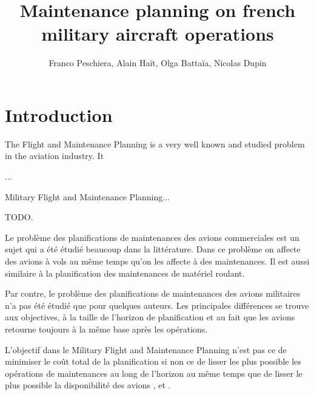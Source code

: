 \documentclass{roadef}
\begin{document}
\title{Maintenance planning on french military aircraft operations}

\def\shorttitle{Titre court}

\author{Franco Peschiera, Alain Haït, Olga Battaïa, Nicolas Dupin}


{}


\maketitle
\thispagestyle{empty}



\section{Introduction}

    The Flight and Maintenance Planning is a very well known and studied problem in the aviation industry. It

    ...

    Military Flight and Maintenance Planning...

    TODO.

    

    Le problème des planifications de maintenances des avions commerciales est un sujet qui a été étudié beaucoup dans la littérature. Dans ce problème on affecte des avions à vols au même temps qu'on les affecte à des maintenances. Il est aussi similaire à la planification des maintenances de matériel roulant.

    Par contre, le problème des planifications de maintenances des avions militaires n'a pas été étudié que pour quelques auteurs. Les principales différences se trouve aux objectives, à la taille de l'horizon de planification et au fait que les avions retourne toujours à la même base après les opérations.

    L'objectif dans le Military Flight and Maintenance Planning n'est pas ce de minimiser le coût total de la planification si non ce de lisser les plus possible les opérations de maintenances au long de l'horizon au même temps que de lisser le plus possible la disponibilité des avions \cite{Kozanidis2008}, \cite{Cho2011} et \cite{Verhoeff2015}.
\end{document}
